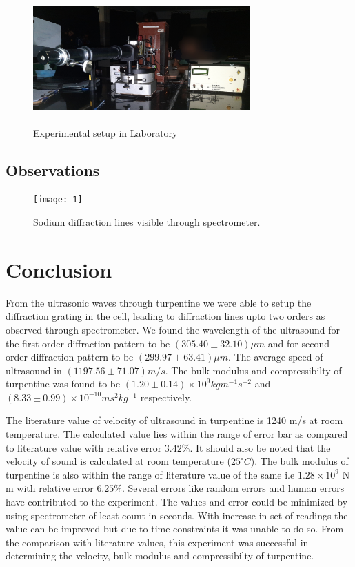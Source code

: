 \documentclass[a4paper, amsfonts, amssymb, amsmath, reprint, showkeys, nofootinbib, twoside]{revtex4-1}
\begin{document}
\begin{figure}[H] %
	\centering
	\includegraphics[width=8.3cm, height=5cm]{2} 
	\caption{Experimental setup in Laboratory}
	\label{1}
\end{figure}

\subsection{Observations}
\begin{figure}[H] %
	\centering
	\texttt{[image: 1]} 
	\caption{Sodium diffraction lines visible through spectrometer.}
	\label{2}
\end{figure}


\section{Conclusion}
From the ultrasonic waves through turpentine we were able to setup the diffraction grating in the cell, leading to diffraction lines upto two orders as observed through spectrometer. We found the wavelength of the ultrasound for the first order diffraction pattern to be $(305.40\pm 32.10)\mu m$ and for second order diffraction pattern to be $(299.97\pm 63.41)\mu m$. The average speed of ultrasound in $(1197.56\pm 71.07) m/s$. The bulk modulus and compressibilty of turpentine was found to be $(1.20\pm 0.14)\times10^9 kg m^{-1} s^{-2}$ and $(8.33\pm 0.99)\times10^{-10} ms^{2}kg^{-1}$ respectively. 

The literature value of velocity of ultrasound in turpentine is 1240 m/s at room temperature. The calculated value lies within the range of error bar as compared to literature value with relative error $3.42 \%$. It should also be noted that the velocity of sound is calculated at room temperature ($25^{\circ} C$). The bulk modulus of turpentine is also within the range of literature value of the same i.e $1.28\times10^9$ N m with relative error $6.25 \%$. Several errors like random errors and human errors have contributed to the experiment. The values and error could be minimized by using spectrometer of least count in seconds. With increase in set of readings the value can be improved but due to time constraints it was unable to do so. From the comparison with literature values, this experiment was successful in determining the velocity, bulk modulus and compressibilty of turpentine.  
\end{document}
